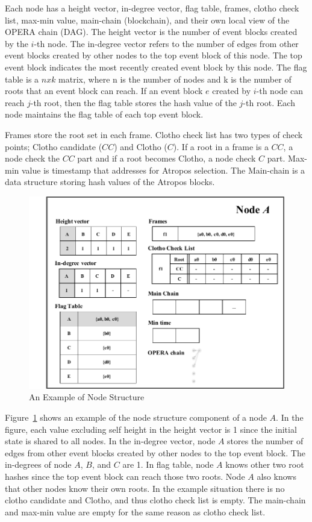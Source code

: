 \documentclass{article}
\begin{document}
Each node has a height vector, in-degree vector, flag table, frames, clotho check list, max-min value, main-chain (blockchain), and their own local view of the OPERA chain (DAG). The height vector is the number of event blocks created by the $i$-th node. The in-degree vector refers to the number of edges from other event blocks created by other nodes to the top event block of this node. The top event block indicates the most recently created event block by this node. The flag table is a $n x k$ matrix, where n is the number of nodes and k is the number of roots that an event block can reach. If an event block $e$ created by $i$-th node can reach $j$-th root, then the flag table stores the hash value of the $j$-th root. Each node maintains the flag table of each top event block. 

Frames store the root set in each frame. Clotho check list has two types of check points; Clotho candidate ($CC$) and Clotho ($C$). If a root in a frame is a $CC$, a node check the $CC$ part and if a root becomes Clotho, a node check $C$ part. Max-min value is timestamp that addresses for Atropos selection. The Main-chain is a data structure storing hash values of the Atropos blocks. 

\begin{figure}[H] \centering  
\includegraphics[width=.5\textwidth]{Node_structure.pdf}
\caption{An Example of Node Structure}
\label{fig:node}
\end{figure}

Figure~\ref{fig:node} shows an example of the node structure component of a node $A$. In the figure, each value excluding self height in the height vector is 1 since the initial state is shared to all nodes. In the in-degree vector, node $A$ stores the number of edges from other event blocks created by other nodes to the top event block. The in-degrees of node $A$, $B$, and $C$ are 1. 
In flag table, node $A$ knows other two root hashes since the top event block can reach those two roots. Node $A$ also knows that other nodes know their own roots. In the example situation there is no clotho candidate and Clotho, and thus clotho check list is empty. The main-chain and max-min value are empty for the same reason as clotho check list. 
\end{document}

